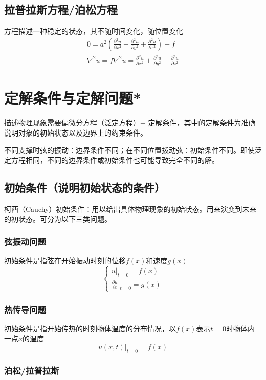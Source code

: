 \subsection{拉普拉斯方程/泊松方程}
方程描述一种稳定的状态，其不随时间变化，随位置变化
\begin{gather*}
0=a^2\left(\frac{\partial^2u}{\partial x^2}+\frac{\partial^2u}{\partial y^2}+\frac{\partial^2u}{\partial z^2}\right)+f\\
\nabla^2u=f  \nabla^2u=\frac{\partial^2u}{\partial x^2}+\frac{\partial^2u}{\partial y^2}+\frac{\partial^2u}{\partial z^2}
\end{gather*}

\section{定解条件与定解问题*}

描述物理现象需要偏微分方程（泛定方程）+ 定解条件，其中的定解条件为准确说明对象的初始状态以及边界上的约束条件。
	
不同支撑时弦的振动：边界条件不同；在不同位置拨动弦：初始条件不同。即使泛定方程相同，不同的边界条件或初始条件也可能导致完全不同的解。

\subsection{初始条件（说明初始状态的条件）}
柯西（Cauchy）初始条件：用以给出具体物理现象的初始状态。用来演变到未来的初状态。可分为以下三类问题。


\subsubsection{弦振动问题}

初始条件是指弦在开始振动时刻的位移\(f(x)\)和速度\(g(x)\)
\[
\begin{cases}u|_{t=0}=f(x)\\\frac{\partial u}{\partial t}|_{t=0}=g(x)\end{cases}
\]

\subsubsection{热传导问题}

初始条件是指开始传热的时刻物体温度的分布情况，以\(f(x)\)表示\(t=0\)时物体内一点\(x\)的温度\[
u(x,t)|_{t=0}=f(x)
\]

\subsubsection{泊松/拉普拉斯}

